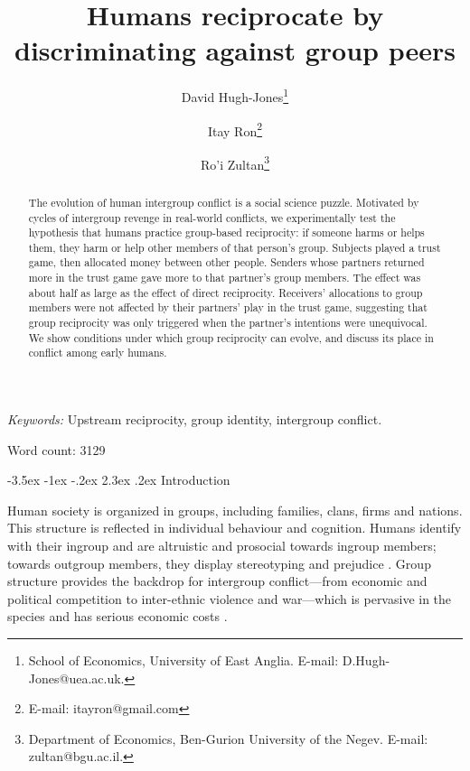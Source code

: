 \documentclass[12pt,a4paper]{article}\usepackage[]{graphicx}\usepackage[]{color}
\title{\bf\sffamily Humans reciprocate by discriminating against group peers}
\author{David Hugh-Jones\thanks{School of Economics, University of East Anglia. E-mail: D.Hugh-Jones@uea.ac.uk.} \and Itay Ron\thanks{E-mail: itayron@gmail.com} \and Ro'i Zultan\thanks{Department of Economics, Ben-Gurion University of the Negev. E-mail: zultan@bgu.ac.il.}}
\date{}
\makeatletter
\renewcommand\section{\@startsection {section}{1}{\z@}%
{-3.5ex \@plus -1ex \@minus -.2ex}%
{2.3ex \@plus.2ex}%
{\bf\sffamily\Large}}
\makeatother
\begin{document}
\maketitle

\begin{abstract}
The evolution of human intergroup conflict is a social science puzzle.
Motivated by cycles of intergroup revenge in real-world conflicts, we experimentally
test the hypothesis that humans practice group-based reciprocity: if someone
harms or helps them, they harm or help other members of that person's group.
Subjects played a trust game, then allocated money between other people. Senders
whose partners returned more in the trust game gave more to that partner's group
members. The effect was about half as large as the effect of direct reciprocity.
Receivers' allocations to group members were not affected by their partners’
play in the trust game, suggesting that group reciprocity was only triggered when the
partner's intentions were unequivocal. We show conditions under which group
reciprocity can evolve, and discuss its place in conflict among early humans.
\end{abstract}

\emph{Keywords:} Upstream reciprocity, group identity, intergroup conflict.

Word count: 3129

\newpage

\section{Introduction}

Human society is organized in groups, including families, clans, firms and nations. This
structure is reflected in individual behaviour and cognition. Humans identify
with their ingroup and are altruistic and prosocial towards ingroup members;
towards outgroup members, they display stereotyping and prejudice
\citep{tajfel1979integrative,yamagishi2000thegroup,balliet2014ingroup,DeDreu2014,chen2009group,chen2011potential}.
Group structure provides the backdrop for intergroup conflict---from economic
and political competition to inter-ethnic violence and war---which is pervasive
in the species \citep{esteban2012ethnicity} and has serious economic costs \citep{world_bank_world_2011}.
\end{document}
